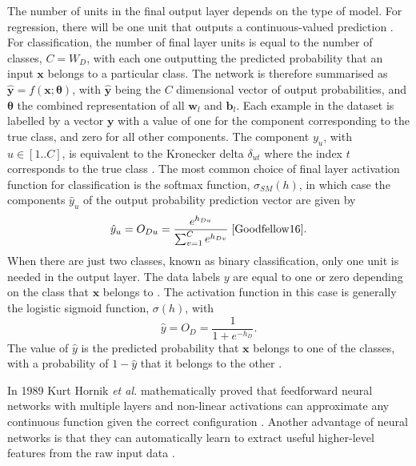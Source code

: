 \documentclass[12pt]{article}
\begin{document}
The number of units in the final output layer depends on the type of model. For regression, there will be one unit that outputs a continuous-valued prediction \cite{Goodfellow16}. For classification, the number of final layer units is equal to the number of classes, $C=W_D$, with each one outputting the predicted probability that an input $\bm{x}$ belongs to a particular class. The network is therefore summarised as $\hat{\bm{y}}=f(\bm{x};\bm\theta)$, with $\hat{\bm{y}}$ being the $C$ dimensional vector of output probabilities, and $\bm\theta$ the combined representation of all $\bm{w}_l$ and $\bm{b}_l$. Each example in the dataset is labelled by a vector $\bm{y}$ with a value of one for the component corresponding to the true class, and zero for all other components. The component $y_u$, with $u\in[1..C]$, is equivalent to the Kronecker delta $\delta_{ut}$ where the index $t$ corresponds to the true class \cite{Goodfellow16}. The most common choice of final layer activation function for classification is the softmax function, $\sigma_{SM}(h)$, in which case the components $\hat{y}_u$ of the output probability prediction vector are given by
\begin{equation}
\hat{y}_u=O_{Du}=\frac{e^{h_{Du}}}{\sum_{v=1}^{C}e^{h_{Dv}}}\;\cite{Goodfellow16}.
\end{equation} 
When there are just two classes, known as binary classification, only one unit is needed in the output layer. The data labels $y$ are equal to one or zero depending on the class that $\bm{x}$ belongs to \cite{Goodfellow16}. The activation function in this case is generally the logistic sigmoid function, $\sigma(h)$, with
\begin{equation}
\hat{y}=O_D=\frac{1}{1+e^{-h_D}}.
\end{equation}
The value of $\hat{y}$ is the predicted probability that $\bm{x}$ belongs to one of the classes, with a probability of $1-\hat{y}$ that it belongs to the other \cite{Goodfellow16}. 

In 1989 Kurt Hornik \textit{et al.} mathematically proved that feedforward neural networks with multiple layers and non-linear activations can approximate any continuous function given the correct configuration \cite{Hornik89}. Another advantage of neural networks is that they can automatically learn to extract useful higher-level features from the raw input data \cite{Haykin98}.
\end{document}
